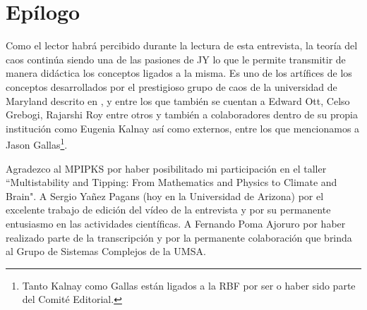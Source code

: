 \documentclass{rbf}
\begin{document}
\section{Epílogo}\label{epi}
Como el lector habrá percibido durante la lectura de esta entrevista, la teoría del caos continúa siendo una de las pasiones de JY lo que le permite transmitir de manera didáctica los conceptos ligados a la misma. Es uno de los artífices de los conceptos desarrollados por el prestigioso grupo de caos de la universidad de Maryland descrito en \cite{UMD17}, y entre los que también se cuentan a Edward Ott, Celso Grebogi, Rajarshi Roy entre otros y también a colaboradores dentro de su propia institución como Eugenia Kalnay así como externos, entre los que mencionamos a Jason Gallas\footnote{Tanto Kalnay como Gallas están ligados a la RBF por ser o haber sido parte del Comité Editorial.}.

\begin{acknowledgments}
Agradezco al MPIPKS por haber posibilitado mi participación en el taller ``Multistability and Tipping: From Mathematics and Physics to Climate and Brain". A Sergio Yañez Pagans (hoy en la Universidad de Arizona) por el excelente trabajo de edición del vídeo de la entrevista y por su permanente entusiasmo en las actividades científicas. A Fernando Poma Ajoruro por haber realizado parte de la transcripción y por la permanente colaboración que brinda al Grupo de Sistemas Complejos de la UMSA.
\end{acknowledgments}
\end{document}
